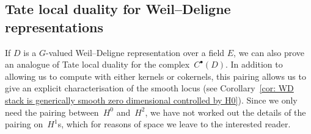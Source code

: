 \documentclass{amsart}
\def\Ad{\mathrm{Ad}}
\def\ad{\mathrm{ad}}
\theoremstyle{definition}
\theoremstyle{remark}
\newcommand{\mar}[1]{}
\newcommand{\mar}[1]{\marginpar{\raggedright\tiny squirrel #1}}
\DeclareMathOperator{\Gal}{Gal}
\begin{document}


\subsection{Tate local duality for Weil--Deligne
  representations}\label{subsec: Tate duality}


If $D$ is a $G$-valued Weil--Deligne representation %
over a field
$E$, we can also prove an analogue of Tate local duality for the
complex~$C^\bullet(D)$. %
In addition to allowing us to compute with either kernels or cokernels, this pairing allows us to give an explicit characterisation of the
smooth locus (see Corollary~\ref{cor: WD stack is generically smooth zero dimensional
  controlled by H0}). %
Since we only need the pairing
between~$H^0$ and~$H^2$, we have not worked out the details of the
pairing on~$H^1$s, which for reasons of space we leave to the
interested reader.
\end{document}
